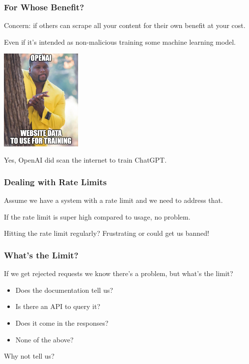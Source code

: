 \begin{frame}
\frametitle{For Whose Benefit?}

Concern: if others can scrape all your content for their own benefit at your cost.

Even if it's intended as non-malicious training some machine learning model. 

\begin{center}
  \includegraphics[width=0.3\textwidth]{images/openaitraining.jpg}
\end{center}

Yes, OpenAI did scan the internet to train ChatGPT.

\end{frame}

\begin{frame}
\frametitle{Dealing with Rate Limits}

Assume we have a system with a rate limit and we need to address that.

If the rate limit is super high compared to usage, no problem.

Hitting the rate limit regularly? Frustrating or could get us banned!

\end{frame}

\begin{frame}
\frametitle{What's the Limit?}
If we get rejected requests we know there's a problem, but what's the limit?

\begin{itemize}
	\item Does the documentation tell us?
	\item Is there an API to query it?
	\item Does it come in the responses?
	\item None of the above?
\end{itemize}

Why not tell us?

\end{frame}


